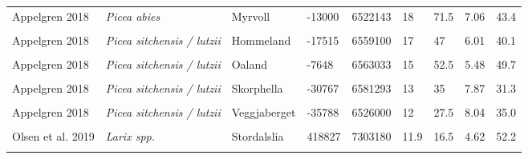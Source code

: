 \documentclass[
]{article}
\begin{document}
\begin{landscape}
\begin{longtable}[t]{l>{}llllllll}
Appelgren 2018 & \em{Picea abies} & Myrvoll & -13000 & 6522143 & 18 & 71.5 & 7.06 & 43.4\\
\addlinespace
\cellcolor{gray!6}{Appelgren 2018} & \em{\cellcolor{gray!6}{Picea sitchensis / lutzii}} & \cellcolor{gray!6}{Foersvoll} & \cellcolor{gray!6}{-29434} & \cellcolor{gray!6}{6588711} & \cellcolor{gray!6}{24} & \cellcolor{gray!6}{54} & \cellcolor{gray!6}{7.22} & \cellcolor{gray!6}{37.7}\\
Appelgren 2018 & \em{Picea sitchensis / lutzii} & Hommeland & -17515 & 6559100 & 17 & 47 & 6.01 & 40.1\\
\cellcolor{gray!6}{Appelgren 2018} & \em{\cellcolor{gray!6}{Picea sitchensis / lutzii}} & \cellcolor{gray!6}{Hyljafjellet} & \cellcolor{gray!6}{-34044} & \cellcolor{gray!6}{6529954} & \cellcolor{gray!6}{13.5} & \cellcolor{gray!6}{45} & \cellcolor{gray!6}{7.30} & \cellcolor{gray!6}{39.6}\\
Appelgren 2018 & \em{Picea sitchensis / lutzii} & Oaland & -7648 & 6563033 & 15 & 52.5 & 5.48 & 49.7\\
\cellcolor{gray!6}{Appelgren 2018} & \em{\cellcolor{gray!6}{Picea sitchensis / lutzii}} & \cellcolor{gray!6}{Sandve} & \cellcolor{gray!6}{-58701} & \cellcolor{gray!6}{6601600} & \cellcolor{gray!6}{11} & \cellcolor{gray!6}{30} & \cellcolor{gray!6}{7.83} & \cellcolor{gray!6}{38.8}\\
\addlinespace
Appelgren 2018 & \em{Picea sitchensis / lutzii} & Skorphella & -30767 & 6581293 & 13 & 35 & 7.87 & 31.3\\
\cellcolor{gray!6}{Appelgren 2018} & \em{\cellcolor{gray!6}{Picea sitchensis / lutzii}} & \cellcolor{gray!6}{Starebakkane} & \cellcolor{gray!6}{-43287} & \cellcolor{gray!6}{6563381} & \cellcolor{gray!6}{18} & \cellcolor{gray!6}{52.5} & \cellcolor{gray!6}{8.08} & \cellcolor{gray!6}{27.9}\\
Appelgren 2018 & \em{Picea sitchensis / lutzii} & Veggjaberget & -35788 & 6526000 & 12 & 27.5 & 8.04 & 35.0\\
\cellcolor{gray!6}{Appelgren 2018} & \em{\cellcolor{gray!6}{Picea sitchensis / lutzii}} & \cellcolor{gray!6}{Vikra} & \cellcolor{gray!6}{-59126} & \cellcolor{gray!6}{6601266} & \cellcolor{gray!6}{22\textsuperscript{*}} & \cellcolor{gray!6}{78} & \cellcolor{gray!6}{7.97} & \cellcolor{gray!6}{37.5}\\
Olsen et al. 2019 & \em{Larix spp.} & Stordalslia & 418827 & 7303180 & 11.9 & 16.5 & 4.62 & 52.2\\
\addlinespace
\cellcolor{gray!6}{Olsen et al. 2019} & \em{\cellcolor{gray!6}{Picea abies}} & \cellcolor{gray!6}{Storbergan} & \cellcolor{gray!6}{413255} & \cellcolor{gray!6}{7349964} & \cellcolor{gray!6}{13.1} & \cellcolor{gray!6}{49} & \cellcolor{gray!6}{5.02} & \cellcolor{gray!6}{55.6}\\

\end{longtable}
\end{landscape}
\end{document}
